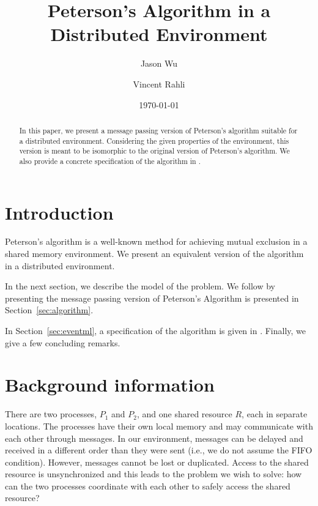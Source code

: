 \documentclass[final]{article}
\begin{document}
\title{Peterson's Algorithm in a Distributed Environment}
\author{Jason Wu \and Vincent Rahli}
\date{\today}
\maketitle

\begin{abstract}
In this paper, we present a message passing version of Peterson's
algorithm suitable for a distributed environment.  Considering the
given properties of the environment, this version is meant to be
isomorphic to the original version of Peterson's algorithm.
%
We also provide a concrete specification of the algorithm in \eml.
\end{abstract}



\listoffixmes


\section{Introduction}

Peterson's algorithm is a well-known method for achieving mutual
exclusion in a shared memory environment.  We present an equivalent
version of the algorithm in a distributed environment.

In the next section, we describe the model of the problem.  We follow
by presenting the message passing version of Peterson's Algorithm is
presented in Section~\ref{sec:algorithm}.

In Section~\ref{sec:eventml}, a specification of the algorithm is
given in \eml.  Finally, we give a few concluding remarks.



\section{Background information}

There are two processes, $P_1$ and $P_2$, and one shared resource $R$,
each in separate locations.  The processes have their own local memory
and may communicate with each other through messages.  In our
environment, messages can be delayed and received in a different order
than they were sent (i.e., we do not assume the FIFO condition).
However, messages cannot be lost or duplicated.  Access to the shared
resource is unsynchronized and this leads to the problem we wish to
solve: how can the two processes coordinate with each other to safely
access the shared resource?
\end{document}
